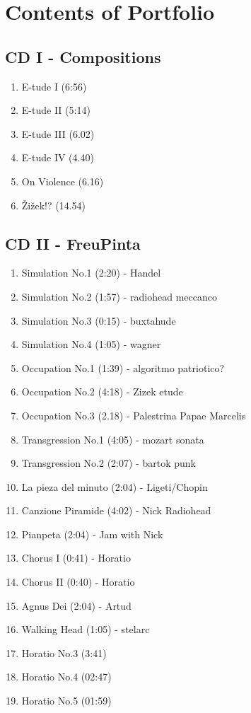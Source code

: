 \chapter*{Contents of Portfolio}
\hypertarget{portfolio}{}

\section*{CD I - Compositions}

\begin{enumerate}
\item E-tude I (6:56)
\item E-tude II (5:14)
\item E-tude III (6.02)
\item E-tude IV (4.40)
\item On Violence (6.16)
\item \v{Z}i\v{z}ek!? (14.54)
\end{enumerate}

\section*{CD II - FreuPinta}

\begin{enumerate}
\item Simulation No.1 (2:20) - Handel
\item Simulation No.2 (1:57) - radiohead meccanco
\item Simulation No.3 (0:15) - buxtahude
\item Simulation No.4 (1:05) - wagner
\item Occupation No.1 (1:39) - algoritmo patriotico?
\item Occupation No.2 (4:18) - Zizek etude
\item Occupation No.3 (2.18) - Palestrina Papae Marcelis
\item Transgression No.1 (4:05) - mozart sonata
\item Transgression No.2 (2:07) - bartok punk

\item La pieza del minuto (2:04) - Ligeti/Chopin
\item Canzione Piramide (4:02) - Nick Radiohead
\item Pianpeta (2:04) - Jam with Nick

\item Chorus I (0:41) - Horatio
\item Chorus II (0:40) - Horatio
\item Agnus Dei (2:04) - Artud

\item Walking Head (1:05) - stelarc
\item Horatio No.3 (3:41)
\item Horatio No.4 (02:47)
\item Horatio No.5 (01:59)
\end{enumerate}


